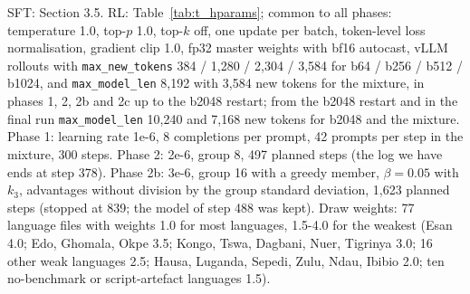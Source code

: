SFT: Section 3.5. RL: Table~\ref{tab:t_hparams}; common to all phases: temperature 1.0, top-\(p\) 1.0, top-\(k\) off, one update per batch, token-level loss normalisation, gradient clip 1.0, fp32 master weights with bf16 autocast, vLLM rollouts with \texttt{max\_new\_tokens} 384 / 1,280 / 2,304 / 3,584 for b64 / b256 / b512 / b1024, and \texttt{max\_model\_len} 8,192 with 3,584 new tokens for the mixture, in phases 1, 2, 2b and 2c up to the b2048 restart; from the b2048 restart and in the final run \texttt{max\_model\_len} 10,240 and 7,168 new tokens for b2048 and the mixture. Phase 1: learning rate 1e-6, 8 completions per prompt, 42 prompts per step in the mixture, 300 steps. Phase 2: 2e-6, group 8, 497 planned steps (the log we have ends at step 378). Phase 2b: 3e-6, group 16 with a greedy member, \(\beta=0.05\) with \(k_3\), advantages without division by the group standard deviation, 1,623 planned steps (stopped at 839; the model of step 488 was kept). Draw weights: 77 language files with weights 1.0 for most languages, 1.5-4.0 for the weakest (Esan 4.0; Edo, Ghomala, Okpe 3.5; Kongo, Tswa, Dagbani, Nuer, Tigrinya 3.0; 16 other weak languages 2.5; Hausa, Luganda, Sepedi, Zulu, Ndau, Ibibio 2.0; ten no-benchmark or script-artefact languages 1.5).

